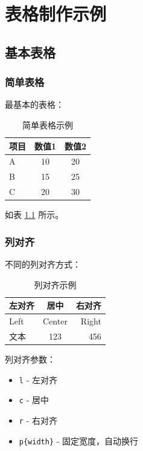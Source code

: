 
\chapter{表格制作示例}

\section{基本表格}

\subsection{简单表格}

最基本的表格：

\begin{table}[htbp]
  \centering
  \caption{简单表格示例}
  \label{tab:simple}
  \begin{tabular}{lcc}
    \hline
    项目 & 数值1 & 数值2 \\
    \hline
    A & 10 & 20 \\
    B & 15 & 25 \\
    C & 20 & 30 \\
    \hline
  \end{tabular}
\end{table}

如表 \ref{tab:simple} 所示。

\subsection{列对齐}

不同的列对齐方式：

\begin{table}[htbp]
  \centering
  \caption{列对齐示例}
  \begin{tabular}{lcr}
    \hline
    左对齐 & 居中 & 右对齐 \\
    \hline
    Left & Center & Right \\
    文本 & 123 & 456 \\
    \hline
  \end{tabular}
\end{table}

列对齐参数：
\begin{itemize}
  \item \texttt{l} - 左对齐
  \item \texttt{c} - 居中
  \item \texttt{r} - 右对齐
  \item \texttt{p\{width\}} - 固定宽度，自动换行
\end{itemize}

